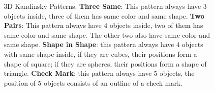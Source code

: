 \documentclass[
]{ceurart}
\begin{document}
	
	
	
	\begin{figure}[!htb]
		\centering
		\caption{3D Kandinsky Patterns. 
			\textbf{Three Same}: This pattern always have 3 objects inside, three of them has same color and same shape. 
			\textbf{Two Pairs}: This pattern always have 4 objects inside, two of them has same color and same shape. The other two also have same color and same shape.
			\textbf{Shape in Shape}: this pattern always have 4 objects with same shape inside, if they are cubes, their positions form a shape of square; if they are spheres, their positions form a shape of triangle.
			\textbf{Check Mark}: this pattern always have 5 objects, the position of 5 objects consists of an outline of a check mark.}
		\label{fig:3DKP-patterns}
	\end{figure}
	
	
	
\end{document}
